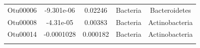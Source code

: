 \documentclass[]{article}
\begin{document}
\begin{longtable}[]{@{}ccccc@{}}
\begin{minipage}[t]{0.13\columnwidth}\centering\strut
Otu00006\strut
\end{minipage} & \begin{minipage}[t]{0.16\columnwidth}\centering\strut
-9.301e-06\strut
\end{minipage} & \begin{minipage}[t]{0.14\columnwidth}\centering\strut
0.02246\strut
\end{minipage} & \begin{minipage}[t]{0.13\columnwidth}\centering\strut
Bacteria\strut
\end{minipage} & \begin{minipage}[t]{0.27\columnwidth}\centering\strut
Bacteroidetes\strut
\end{minipage}\tabularnewline
\begin{minipage}[t]{0.13\columnwidth}\centering\strut
Otu00008\strut
\end{minipage} & \begin{minipage}[t]{0.16\columnwidth}\centering\strut
-4.31e-05\strut
\end{minipage} & \begin{minipage}[t]{0.14\columnwidth}\centering\strut
0.00383\strut
\end{minipage} & \begin{minipage}[t]{0.13\columnwidth}\centering\strut
Bacteria\strut
\end{minipage} & \begin{minipage}[t]{0.27\columnwidth}\centering\strut
Actinobacteria\strut
\end{minipage}\tabularnewline
\begin{minipage}[t]{0.13\columnwidth}\centering\strut
Otu00014\strut
\end{minipage} & \begin{minipage}[t]{0.16\columnwidth}\centering\strut
-0.0001028\strut
\end{minipage} & \begin{minipage}[t]{0.14\columnwidth}\centering\strut
0.000182\strut
\end{minipage} & \begin{minipage}[t]{0.13\columnwidth}\centering\strut
Bacteria\strut
\end{minipage} & \begin{minipage}[t]{0.27\columnwidth}\centering\strut
Actinobacteria\strut
\end{minipage}\tabularnewline
\begin{minipage}[t]{0.13\columnwidth}\centering\strut

\end{minipage}
\end{longtable}
\end{document}
